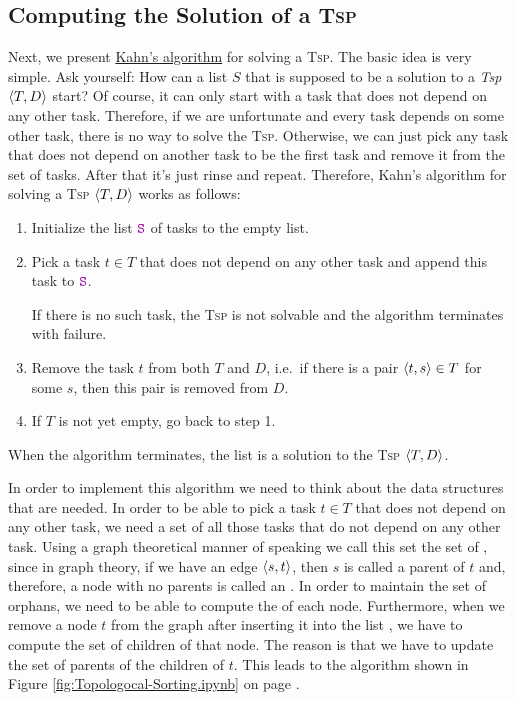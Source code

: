 \subsection{Computing the Solution of a \textsc{Tsp}}
Next, we present \href{https://en.wikipedia.org/wiki/Topological_sorting}{Kahn's algorithm} \cite{kahn:1962} for solving a \textsc{Tsp}.
The basic idea is very simple. Ask yourself:  How can a list $S$ that is supposed to be a solution to a
\textsl{Tsp} $\pair(T, D)$ start? 
Of course, it can only start with a task that does not depend on any other task.  Therefore, if we are
unfortunate and every task depends on some other task, there is no way to solve the \textsc{Tsp}.  Otherwise,
we can just pick any task that does not depend on another task to be the first task and remove it from the set
of tasks.  After that it's just rinse and repeat.  Therefore, Kahn's algorithm for solving a \textsc{Tsp}
$\pair(T, D)$ works as follows: 
\begin{enumerate}
\item Initialize the list $\mytt{S}$ of tasks to the empty list.
\item Pick a task $t \in T$ that does not depend on any other task and append this task to $\mytt{S}$.

      If there is no such task, the \textsc{Tsp} is not solvable and the algorithm terminates with failure.
\item Remove the task $t$ from both $T$ and $D$, i.e.~if there is a pair $\pair(t, s) \in T$ for some $s$, then
      this pair is removed from $D$.
\item If $T$ is not yet empty, go back to step 1.  
\end{enumerate}
When the algorithm terminates, the list  is a solution to the \textsc{Tsp} $\pair(T, D)$.

In order to implement this algorithm we need to think about the data structures that are needed.
In order to be able to pick a task $t \in T$ that does not depend on any other task, we need a set of all those
tasks that do not depend on any other task.  Using a graph theoretical manner of speaking we call this set the
set of , since in graph theory, if we have an edge $\pair(s, t)$, then $s$ is called a parent of
$t$ and, therefore, a node with no parents is called an .  In order to maintain the set of
orphans, we need to be able to compute the  of each node.  Furthermore, when we remove a node $t$
from the graph after inserting it into the list , we have to compute the set of children of that
node.  The reason is that we have to update the set of parents of the children of $t$.  This leads to the algorithm
shown in Figure \ref{fig:Topologocal-Sorting.ipynb} on page \pageref{fig:Topologocal-Sorting.ipynb}.

